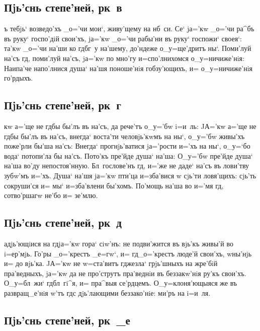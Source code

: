 \documentclass[12pt,twoside,a6paper,xdvi,civil=antiqua]{hipbook}
\begin{document}
\delimpict

\subsection{Пjь'снь степе'ней, рк~в}

ъ тебjь` возведо'хъ _о='чи мои`, живу'щему на нб~си. Се` jа='кw _о='чи
ра^бъ въ руку` госпо'дiй свои'хъ, jа='кw _о='чи рабы'ни въ руку` госпожи`
своея`: та'кw _о='чи на'ши ко гд бг~у на'шему, до'ндеже о_у=ще'дритъ
ны`. Поми'луй на'съ гд, поми'луй на'съ, jа='кw по мно'гу и=спо'лнихомся
о_у=ничиже'нiя: Наипа'че напо'лнися душа` на'шя поноше'нiя гобзу'ющихъ, и=
о_у=ничиже'нiя го'р\-дыхъ.

\delimpict

\subsection{Пjь'снь степе'ней, рк~г}

кw а='ще не гд бы бы'лъ въ на'съ, да рече'тъ о_у='бw i=и~ль:
JА='кw а='ще не гд бы бы'лъ въ на'съ, внегда` воста'ти человjь'кwмъ на ны`,
о_у='бw живы'хъ поже'рли бы'ша на'съ: Внегда` прогнjь'ватися jа='рости и='хъ
на ны`, о_у=`бо вода` потопи'ла бы на'съ. Пото'къ пре'йде душа` на'ша: О_у='бw
пре'йде душа` на'ша во'ду непостоя'нную. Бл~гослове'нъ гд, и='же не даде`
на'съ въ лови'тву зубw'мъ и='хъ. Душа` на'шя jа='кw пти'ца и=зба'вися w\т
сjь'ти ловя'щихъ: сjь'ть сокруши'ся и= мы` и=зба'влени бы'хомъ. По'мощь на'ша
во и='мя гд, сотво'ршагw не'бо и= зе'млю.

\slava

\delimpict

\subsection{Пjь'снь степе'ней, рк~д}

адjь'ющiися на гд jа='кw гора` сiw'нъ: не подви'жится въ вjь'къ
живы'й во i=ер'мjь. Го'\-ры _о='крестъ _е=гw`, и= гд _о='крестъ люде'й
сво\-и'хъ, w\т ны'нjь и= до вjь'ка. JА='кw не w=ста'витъ гд жезла` грjь'шныхъ
на жре'бiй пра'ведныхъ, jа='кw да не про'струтъ пра'веднiи въ беззакw'нiя
ру'къ свои'хъ. О_у=бл~жи` гд бл~гi^я, и= пра^выя
се'рдцемъ. О_у=клоня'ющыяся же въ раз\-вра\-щ_е'\-нiя w'тъ гд с дjь'\-ла\-ю\-щи\-ми
без\-за\-ко'\-нiе: ми'ръ на i=и~ля.

\delimpict

\subsection{Пjь'снь степе'ней, рк~_е}
\end{document}
